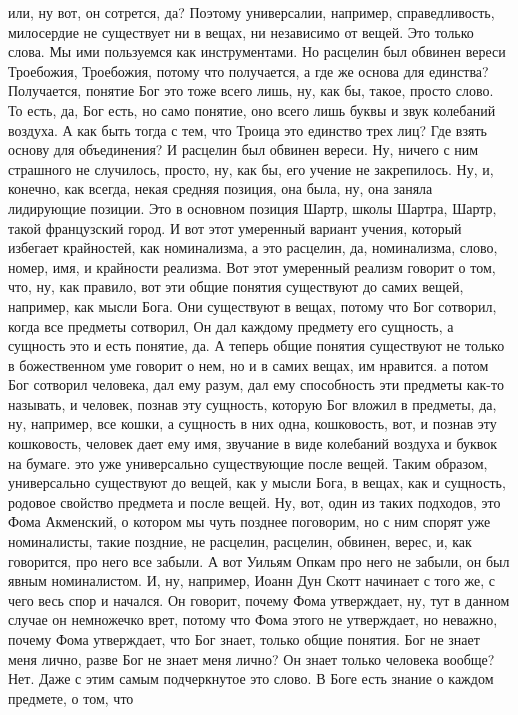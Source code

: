 или, ну вот, он сотрется, да? Поэтому универсалии, например, справедливость,
милосердие не существует ни в вещах, ни независимо от вещей. Это только слова.
Мы ими пользуемся как инструментами. Но расцелин был обвинен вереси Троебожия,
Троебожия, потому что получается, а где же основа для единства? Получается,
понятие Бог это тоже всего лишь, ну, как бы, такое, просто слово. То есть, да,
Бог есть, но само понятие, оно всего лишь буквы и звук колебаний воздуха. А как
быть тогда с тем, что Троица это единство трех лиц? Где взять основу для
объединения? И расцелин был обвинен вереси. Ну, ничего с ним страшного не
случилось, просто, ну, как бы, его учение не закрепилось. Ну, и, конечно, как
всегда, некая средняя позиция, она была, ну, она заняла лидирующие позиции. Это
в основном позиция Шартр, школы Шартра, Шартр, такой французский город. И вот
этот умеренный вариант учения, который избегает крайностей, как номинализма, а
это расцелин, да, номинализма, слово, номер, имя, и крайности реализма. Вот этот
умеренный реализм говорит о том, что, ну, как правило, вот эти общие понятия
существуют до самих вещей, например, как мысли Бога. Они существуют в вещах,
потому что Бог сотворил, когда все предметы сотворил, Он дал каждому предмету
его сущность, а сущность это и есть понятие, да. А теперь общие понятия
существуют не только в божественном уме говорит о нем, но и в самих вещах, им
нравится. а потом Бог сотворил человека, дал ему разум, дал ему способность эти
предметы как-то называть, и человек, познав эту сущность, которую Бог вложил в
предметы, да, ну, например, все кошки, а сущность в них одна, кошковость, вот, и
познав эту кошковость, человек дает ему имя, звучание в виде колебаний воздуха и
буквок на бумаге. это уже универсально существующие после вещей. Таким образом,
универсально существуют до вещей, как у мысли Бога, в вещах, как и сущность,
родовое свойство предмета и после вещей. Ну, вот, один из таких подходов, это
Фома Акменский, о котором мы чуть позднее поговорим, но с ним спорят уже
номиналисты, такие поздние, не расцелин, расцелин, обвинен, верес, и, как
говорится, про него все забыли. А вот Уильям Опкам про него не забыли, он был
явным номиналистом. И, ну, например, Иоанн Дун Скотт начинает с того же, с чего
весь спор и начался. Он говорит, почему Фома утверждает, ну, тут в данном случае
он немножечко врет, потому что Фома этого не утверждает, но неважно, почему Фома
утверждает, что Бог знает, только общие понятия. Бог не знает меня лично, разве
Бог не знает меня лично? Он знает только человека вообще? Нет. Даже с этим самым
подчеркнутое это слово. В Боге есть знание о каждом предмете, о том, что
